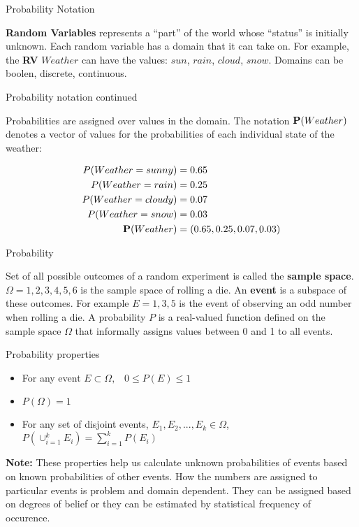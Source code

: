 \documentclass[12pt]{beamer}
\begin{document}
\begin{frame}{Probability Notation} 

{\bf Random Variables} represents a ``part'' of the world whose
``status'' is initially unknown. Each random variable has a domain
that it can take on.  For example, the {\bf RV} $Weather$ can have the
values: $sun$, $rain$, $cloud$, $snow$. Domains can be boolen,
discrete, continuous.
\end{frame}

\begin{frame}{Probability notation continued}

Probabilities are assigned over values in the domain. The notation
${\bf P}(Weather)$ denotes a vector of values for the probabilities of
each individual state of the weather:

\begin{eqnarray*} 
P(Weather = sunny) &= 0.65 \\ 
P(Weather = rain) &= 0.25 \\ 
P(Weather = cloudy) &= 0.07 \\ 
P(Weather = snow) &= 0.03 \\ 
{\bf P}(Weather) &= (0.65, 0.25, 0.07, 0.03) 
\end{eqnarray*}

\end{frame} 

\begin{frame}{Probability} 

Set of all possible outcomes of a random experiment is called the {\bf
  sample space}. $\Omega = {1,2,3,4,5,6}$ is the sample space of
rolling a die. An {\bf event} is a subspace of these outcomes. For
example $E={1,3,5}$ is the event of observing an odd number when
rolling a die. A probability $P$ is a real-valued function defined on
the sample space $\Omega$ that informally assigns values between 0 and 1 to 
all events. 

\end{frame} 

\begin{frame}{Probability properties} 

\begin{itemize} 
\item For any event $E \subset \Omega, \;\;\; 0 \leq P(E) \leq 1$
\item $P(\Omega) = 1$ 
\item For any set of disjoint events, $E_1, E_2, ..., E_k \in \Omega$, 
$P(\cup_{i=1}^{k} E_i) = \sum_{i=1}^{k} P(E_i)$ 
\end{itemize} 
\medskip 
{\bf Note:} These properties help us calculate unknown probabilities
of events based on known probabilities of other events. How the
numbers are assigned to particular events is problem and domain
dependent. They can be assigned based on degrees of belief or they can
be estimated by statistical frequency of occurence.


\end{frame} 
\end{document}
